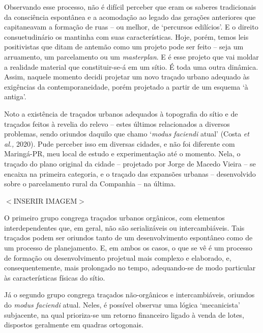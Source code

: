 \documentclass[12pt, a4paper]{book} %
\begin{document}
        Observando esse processo, não é difícil perceber que eram os saberes tradicionais da consciência espontânea e a acomodação ao legado das gerações anteriores que capitaneavam a formação de ruas – ou melhor, de `percursos edilícios'. E o direito consuetudinário os mantinha com suas características. Hoje, porém, temos leis positivistas que ditam de antemão como um projeto pode ser feito – seja um arruamento, um parcelamento ou um \textit{masterplan}. E é esse projeto que vai moldar a realidade material que constituir-se-á em um sítio. É toda uma outra dinâmica. Assim, naquele momento decidi projetar um novo traçado urbano adequado às exigências da contemporaneidade, porém projetado a partir de um esquema `à antiga'.



        Noto a existência de traçados urbanos adequados à topografia do sítio e de traçados feitos à revelia do relevo – estes últimos relacionados a diversos problemas, sendo oriundos daquilo que chamo `\textit{modus faciendi} atual' (Costa \textit{et al.,} 2020). Pude perceber isso em diversas cidades, e não foi diferente com Maringá-PR, meu local de estudo e experimentação até o momento. Nela, o traçado do plano original da cidade – projetado por Jorge de Macedo Vieira – se encaixa na primeira categoria, e o traçado das expansões urbanas – desenvolvido sobre o parcelamento rural da Companhia – na última.  

        $<$INSERIR IMAGEM$>$

        O primeiro grupo congrega traçados urbanos orgânicos, com elementos interdependentes que, em geral, não são serializáveis ou intercambiáveis. Tais traçados podem ser oriundos tanto de um desenvolvimento espontâneo como de um processo de planejamento. E, em ambos os casos, o que se vê é um processo de formação ou desenvolvimento projetual mais complexo e elaborado, e, consequentemente, mais prolongado no tempo, adequando-se de modo particular às características físicas do sítio. 

        Já o segundo grupo congrega traçados não-orgânicos e intercambiáveis, oriundos do \textit{modus faciendi} atual. Neles, é possível observar uma lógica `mecanicista' subjacente, na qual prioriza-se um retorno financeiro ligado à venda de lotes, dispostos geralmente em quadras ortogonais.
\end{document}
